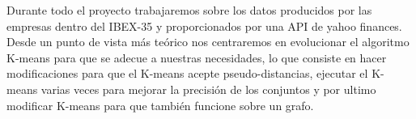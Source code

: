 \documentclass[12pt, letterpaper, twoside]{article}
\begin{document}
Durante todo el proyecto trabajaremos sobre los datos producidos por las empresas dentro del IBEX-35 y proporcionados por una API de yahoo finances.\\
Desde un punto de vista más teórico nos centraremos en evolucionar el algoritmo K-means para que se adecue a nuestras necesidades, lo que consiste en hacer modificaciones para que el K-means acepte pseudo-distancias, ejecutar el K-means varias veces para mejorar la precisión de los conjuntos y por ultimo modificar K-means para que también funcione sobre un grafo.\\


	\vspace{1cm}
\end{document}
